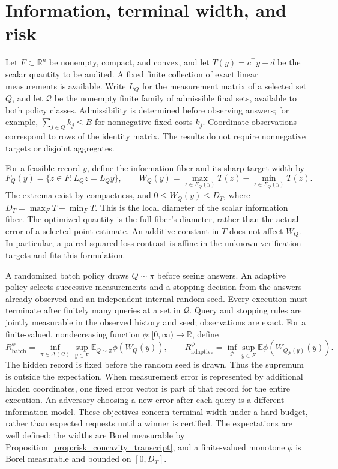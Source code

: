 \section{Information, terminal width, and risk}
\label{sec:risk_setup}
Let $F\subset\mathbb R^n$ be nonempty, compact, and convex, and let
$T(y)=c^\top y+d$ be the scalar quantity to be audited. A fixed finite
collection of exact linear measurements is available. Write $L_Q$ for
the measurement matrix of a selected set $Q$, and let $\mathcal Q$ be
the nonempty finite family of admissible final sets, available to both
policy classes. Admissibility is determined before observing answers; for example,
$\sum_{j\in Q}k_j\le B$ for nonnegative fixed costs $k_j$.
Coordinate observations correspond to rows of the identity matrix.
The results do not require nonnegative targets or disjoint aggregates.

For a feasible record $y$, define the information fiber and its sharp
target width by
\begin{equation}
 F_Q(y)=\{z\in F:L_Qz=L_Qy\},\qquad
 W_Q(y)=\max_{z\in F_Q(y)}T(z)-\min_{z\in F_Q(y)}T(z).
 \label{eq:risk_fiber}
\end{equation}
The extrema exist by compactness, and $0\le W_Q(y)\le D_T$, where
$D_T=\max_F T-\min_F T$. This is the local diameter of the
scalar information fiber. The optimized quantity is the full fiber's
diameter, rather than the actual error of a selected point estimate.
An additive constant in $T$ does
not affect $W_Q$. In particular, a paired squared-loss contrast is
affine in the unknown verification targets and fits this formulation.

A randomized batch policy draws $Q\sim\pi$ before seeing answers. An
adaptive policy selects successive measurements and a stopping decision
from the answers already observed and an independent internal random
seed. Every execution must terminate after finitely many queries at a
set in $\mathcal Q$. Query and stopping rules are jointly measurable in
the observed history and seed; observations are exact. For a finite-valued,
nondecreasing function $\phi:[0,\infty)\to\mathbb R$, define
\begin{equation}
 R_{\mathrm{batch}}^{\phi}
 =\inf_{\pi\in\Delta(\mathcal Q)}\sup_{y\in F}
   \mathbb E_{Q\sim\pi}\phi(W_Q(y)),\qquad
 R_{\mathrm{adaptive}}^{\phi}
 =\inf_{\mathcal P}\sup_{y\in F}
   \mathbb E\phi(W_{Q_{\mathcal P}(y)}(y)).
 \label{eq:risk_objectives}
\end{equation}
The hidden record is fixed before the random seed is drawn. Thus the
supremum is outside the expectation. When measurement error is represented
by additional hidden coordinates, one fixed error vector is part of that
record for the entire execution. An adversary choosing a new error after
each query is a different information model. These objectives concern terminal
width under a hard budget, rather than expected requests until a winner
is certified. The expectations are well defined: the widths are Borel
measurable by Proposition~\ref{prop:risk_concavity_transcript}, and a
finite-valued monotone $\phi$ is Borel measurable and bounded on $[0,D_T]$.


